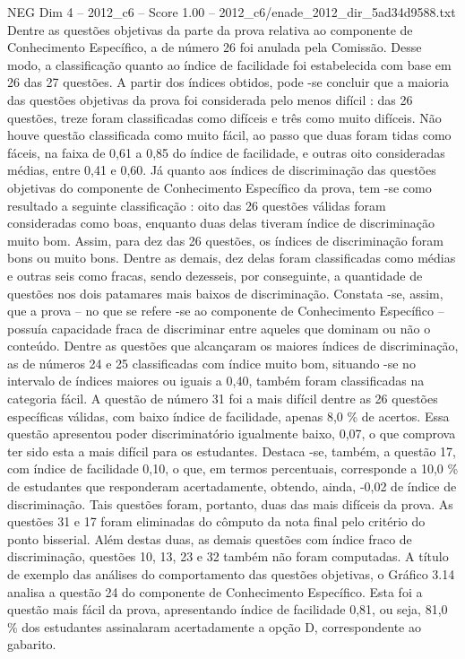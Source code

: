\begin{textsample}{NEG Dim 4 – 2012\_c6 – Score 1.00 – 2012\_c6/enade\_2012\_dir\_5ad34d9588.txt}
Dentre as questões objetivas da parte da prova relativa ao componente de Conhecimento Específico, a de número 26 foi anulada pela Comissão.
Desse modo, a classificação quanto ao índice de facilidade foi estabelecida com base em 26 das 27 questões.
A partir dos índices obtidos, pode -se concluir que a maioria das questões objetivas da prova foi considerada pelo menos difícil : das 26 questões, treze foram classificadas como difíceis e três como muito difíceis.
Não houve questão classificada como muito fácil, ao passo que duas foram tidas como fáceis, na faixa de 0,61 a 0,85 do índice de facilidade, e outras oito consideradas médias, entre 0,41 e 0,60.
Já quanto aos índices de discriminação das questões objetivas do componente de Conhecimento Específico da prova, tem -se como resultado a seguinte classificação : oito das 26 questões válidas foram consideradas como boas, enquanto duas delas tiveram índice de discriminação muito bom.
Assim, para dez das 26 questões, os índices de discriminação foram bons ou muito bons.
Dentre as demais, dez delas foram classificadas como médias e outras seis como fracas, sendo dezesseis, por conseguinte, a quantidade de questões nos dois patamares mais baixos de discriminação.
Constata -se, assim, que a prova – no que se refere -se ao componente de Conhecimento Específico – possuía capacidade fraca de discriminar entre aqueles que dominam ou não o conteúdo.
Dentre as questões que alcançaram os maiores índices de discriminação, as de números 24 e 25 classificadas com índice muito bom, situando -se no intervalo de índices maiores ou iguais a 0,40, também foram classificadas na categoria fácil.
A questão de número 31 foi a mais difícil dentre as 26 questões específicas válidas, com baixo índice de facilidade, apenas 8,0 \% de acertos.
Essa questão apresentou poder discriminatório igualmente baixo, 0,07, o que comprova ter sido esta a mais difícil para os estudantes.
Destaca -se, também, a questão 17, com índice de facilidade 0,10, o que, em termos percentuais, corresponde a 10,0 \% de estudantes que responderam acertadamente, obtendo, ainda, -0,02 de índice de discriminação.
Tais questões foram, portanto, duas das mais difíceis da prova.
As questões 31 e 17 foram eliminadas do cômputo da nota final pelo critério do ponto bisserial.
Além destas duas, as demais questões com índice fraco de discriminação, questões 10, 13, 23 e 32 também não foram computadas.
A título de exemplo das análises do comportamento das questões objetivas, o Gráfico 3.14 analisa a questão 24 do componente de Conhecimento Específico.
Esta foi a questão mais fácil da prova, apresentando índice de facilidade 0,81, ou seja, 81,0 \% dos estudantes assinalaram acertadamente a opção D, correspondente ao gabarito.

\end{textsample}
